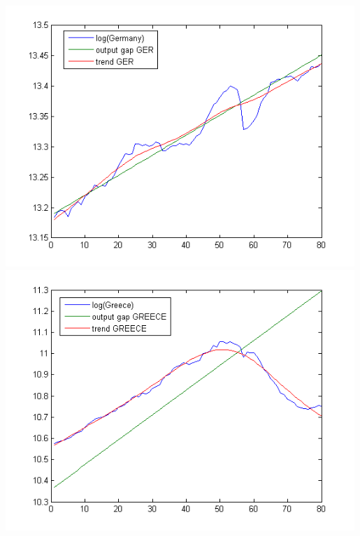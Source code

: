 \documentclass{article}
\begin{document}
\subsection{}


\subsection{}


\subsection{}

\includegraphics[width=0.99\textwidth]{plot1.png}\\
\includegraphics[width=0.99\textwidth]{plot2.png}\\
\end{document}

